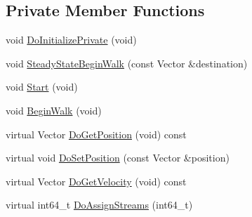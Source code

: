 \subsection*{Private Member Functions}
\begin{DoxyCompactItemize}
\item 
void \hyperlink{classns3_1_1SteadyStateRandomWaypointMobilityModel_a661b708216d6f6c38443d061b0d02c96}{Do\+Initialize\+Private} (void)
\item 
void \hyperlink{classns3_1_1SteadyStateRandomWaypointMobilityModel_a4ff1b8e152ae2b5481baf39a91174c5d}{Steady\+State\+Begin\+Walk} (const Vector \&destination)
\item 
void \hyperlink{classns3_1_1SteadyStateRandomWaypointMobilityModel_afb5dffc7e7b3e1d2f66f98c1300ca443}{Start} (void)
\item 
void \hyperlink{classns3_1_1SteadyStateRandomWaypointMobilityModel_a6db94d1dee3fe984ad422fd9bed2d7db}{Begin\+Walk} (void)
\item 
virtual Vector \hyperlink{classns3_1_1SteadyStateRandomWaypointMobilityModel_a13f34089417481a0585f9a700d99d2d0}{Do\+Get\+Position} (void) const 
\item 
virtual void \hyperlink{classns3_1_1SteadyStateRandomWaypointMobilityModel_a2ffb24cd477f0a23487e914ca50366bc}{Do\+Set\+Position} (const Vector \&position)
\item 
virtual Vector \hyperlink{classns3_1_1SteadyStateRandomWaypointMobilityModel_abd978076b2b54974a511916b9e807697}{Do\+Get\+Velocity} (void) const 
\item 
virtual int64\+\_\+t \hyperlink{classns3_1_1SteadyStateRandomWaypointMobilityModel_ae93040385b173102abf1cd5103026c1a}{Do\+Assign\+Streams} (int64\+\_\+t)
\end{DoxyCompactItemize}
